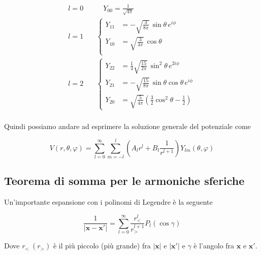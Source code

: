 \begin{equation}
\begin{aligned}
l=0 \quad & \quad Y_{00} = \frac{1}{\sqrt{4\pi}} \\[6pt]
l=1 \quad &
\left\{
\begin{aligned}
Y_{11} &= -\sqrt{\frac{3}{8\pi}}\,\sin\theta\, e^{i\phi} \\
Y_{10} &=  \sqrt{\frac{3}{4\pi}}\,\cos\theta \\
\end{aligned}
\right. \\[10pt]
l=2 \quad &
\left\{
\begin{aligned}
Y_{22} &= \frac14 \sqrt{\frac{15}{2\pi}}\,\sin^{2}\theta\, e^{2i\phi} \\
Y_{21} &= -\sqrt{\frac{15}{8\pi}}\,\sin\theta\cos\theta\, e^{i\phi} \\
Y_{20} &=  \sqrt{\frac{5}{4\pi}} \left( \frac{3}{2}\cos^{2}\theta - \frac12 \right)
\end{aligned}
\right. \\[10pt]
\end{aligned}
\end{equation}

Quindi possiamo andare ad esprimere la soluzione generale del potenziale come 

\begin{tcolorbox}[colback=yellow!10!white, colframe=orange!70!black, boxrule=0.8pt]
\begin{equation}
    V(r,\theta, \varphi) = \sum_{l = 0}^{\infty} \sum_{m = -l} ^ l (A_l r^l + B_l \frac{1}{r^{l+1}}) Y_{lm} (\theta, \varphi)
\end{equation}
\end{tcolorbox}

\newpage

\subsection{Teorema di somma per le armoniche sferiche}

Un'importante espansione con i polinomi di Legendre è la seguente 

\begin{equation}
    \frac{1}{|\mathbf{x} - \mathbf{x'}|} = \sum_{l = 0}^{\infty} \frac{r_< ^l}{r_>^{l + 1}} P_l (\cos \gamma)
    \label{eq:primo_sviluppo}
\end{equation}

Dove $r_< \ (r_>)$ è il più piccolo (più grande) fra $|\mathbf{x}|$ e $|\mathbf{x'}|$ e $\gamma$ è l'angolo fra $\mathbf{x}$ e $\mathbf{x'}$.\\

